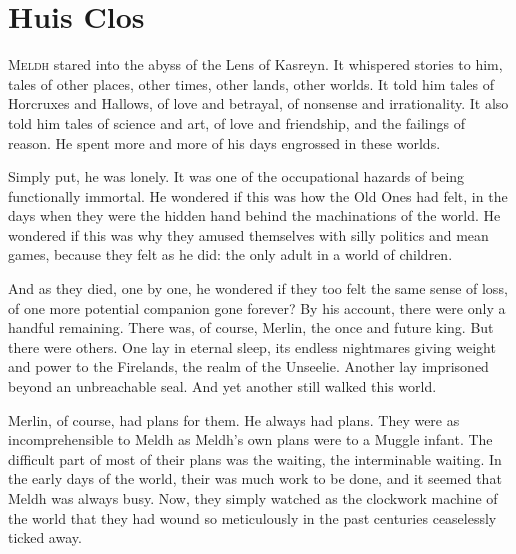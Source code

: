 \chapter{Huis Clos}
\simpleline

\lettrine{M}{eldh} stared into the abyss of the Lens of Kasreyn. It whispered stories to him, tales of other places, other times, other lands, other worlds. It told him tales of Horcruxes and Hallows, of love and betrayal, of nonsense and irrationality. It also told him tales of science and art, of love and friendship, and the failings of reason. He spent more and more of his days engrossed in these worlds.

Simply put, he was lonely. It was one of the occupational hazards of being functionally immortal. He wondered if this was how the Old Ones had felt, in the days when they were the hidden hand behind the machinations of the world. He wondered if this was why they amused themselves with silly politics and mean games, because they felt as he did: the only adult in a world of children.

And as they died, one by one, he wondered if they too felt the same sense of loss, of one more potential companion gone forever? By his account, there were only a handful remaining. There was, of course, Merlin, the once and future king. But there were others. One lay in eternal sleep, its endless nightmares giving weight and power to the Firelands, the realm of the Unseelie. Another lay imprisoned beyond an unbreachable seal. And yet another still walked this world.

Merlin, of course, had plans for them. He always had plans. They were as incomprehensible to Meldh as Meldh’s own plans were to a Muggle infant. The difficult part of most of their plans was the waiting, the interminable waiting. In the early days of the world, their was much work to be done, and it seemed that Meldh was always busy. Now, they simply watched as the clockwork machine of the world that they had wound so meticulously in the past centuries ceaselessly ticked away.


